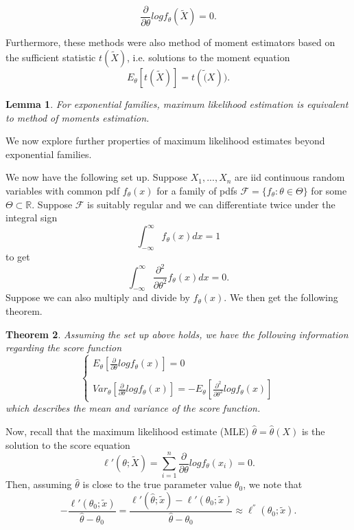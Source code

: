 \documentclass[twoside]{article}
\newcounter{lecnum}
\newtheorem{theorem}{Theorem}[lecnum]
\newtheorem{lemma}[theorem]{Lemma}
\begin{document}
$$
\frac{\partial}{\partial \theta}logf_{\theta}(\tilde{X}) = 0.
$$

Furthermore, these methods were also method of moment estimators based on the sufficient statistic $t(\tilde{X})$, i.e. solutions to the moment equation
$$
E_{\theta}[t(\tilde{X})] = t(\tilde(X)).
$$

\begin{lemma}For exponential families, maximum likelihood estimation is equivalent to method of moments estimation.
\end{lemma}


We now explore further properties of maximum likelihood estimates beyond exponential families.

We now have the following set up. Suppose $X_1,...,X_n$ are iid continuous random variables with common pdf $f_{\theta}(x)$ for a family of pdfs $\mathcal{F} = \{f_{\theta}: \theta \in \Theta\}$ for some $\Theta \subset \mathbb{R}.$ Suppose $\mathcal{F}$ is suitably regular and we can differentiate twice under the integral sign 
$$
\int_{-\infty}^{\infty}f_{\theta}(x)dx = 1
$$
to get 
$$
\int_{-\infty}^{\infty} \frac{\partial^2}{\partial \theta^2} f_{\theta}(x)dx = 0.
$$
Suppose we can also multiply and divide by $f_{\theta}(x).$ We then get the following theorem.

\begin{theorem}Assuming the set up above holds, we have the following information regarding the score function 
$$
\begin{cases}
 E_{\theta}[\frac{\partial}{\partial \theta}log f_{\theta}(x)] = 0\\
\\
Var_{\theta}[\frac{\partial}{\partial \theta}log f_{\theta}(x)] = -E_{\theta}[\frac{\partial^2}{\partial \theta^2}log f_{\theta}(x)]
\end{cases}
$$
which describes the mean and variance of the score function.
\end{theorem}

Now, recall that the maximum likelihood estimate (MLE) $\hat{\theta} = \hat{\theta}(X)$ is the solution to the score equation 
$$
\ell'(\theta; \tilde{X}) = \sum_{i=1}^n\frac{\partial}{\partial \theta}log f_{\theta}(x_i) = 0.
$$
Then, assuming $\hat{\theta}$ is close to the true parameter value $\theta_0$, we note that 
$$
-\frac{\ell'(\theta_0;\tilde{x})}{\hat{\theta} - \theta_0} = \frac{\ell'(\hat{\theta};\tilde{x}) - \ell'(\theta_0;\tilde{x})}{\hat{\theta} - \theta_0} \approx \ell^{''}(\theta_0;\tilde{x}).
$$
\end{document}
